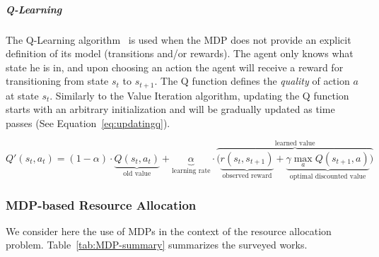 \subparagraph{Q-Learning}
The Q-Learning algorithm~\cite{qlearning} is used when the MDP does not provide an explicit definition of its model (\ie transitions and/or rewards).
The agent only knows what state he is in, and upon choosing an action the agent will receive a reward for transitioning from state $s_t$ to $s_{t+1}$.
The Q function defines the \textit{quality} of action $a$ at state $s_t$.
Similarly to the Value Iteration algorithm, updating the Q function starts with an arbitrary initialization and will be gradually updated as time passes (See Equation~\eqref{eq:updatingq}).

\begin{equation}\label{eq:updatingq}
Q'(s_{t},a_{t}) = (1-\alpha) \cdot \underbrace{Q(s_{t},a_{t})}_{\text{old value}} + \underbrace{\alpha}_{\text{learning rate}} \cdot  \overbrace{\bigg( \underbrace{r(s_t,s_{t+1})}_{\text{observed reward}} + \underbrace{\gamma \max_{a}Q(s_{t+1}, a)}_{\text{optimal discounted value}} \bigg) }^{\text{learned value}}
\end{equation}



\subsubsection{MDP-based Resource Allocation}
\textbf{\newline}
We consider here the use of MDPs in the context of the resource allocation problem.
Table~\ref{tab:MDP-summary} summarizes the surveyed works.



